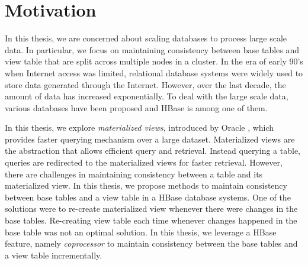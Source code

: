 \documentclass[11pt,a4paper,bibtotoc,idxtotoc,headsepline,footsepline,footexclude,BCOR12mm,DIV13]{scrbook}
\begin{document}

\section{Motivation}
\label{Motivation}


In this thesis, we are concerned about scaling databases to process large scale data. In particular, we focus on maintaining consistency between base tables and view table that are split across multiple nodes in a cluster. In the era of early 90's when Internet access was limited, relational database systems were widely used to store data generated through the Internet. However, over the last decade, the amount of data has increased exponentially. To deal with the large scale data, various databases have been proposed and HBase is among one of them.

In this thesis, we explore \emph{materialized views}, introduced by Oracle \cite{bello1998materialized}, which provides faster querying mechanism over a large dataset. Materialized views  are the abstraction that allows efficient 
query and retrieval. Instead querying a table, queries are redirected to the materialized views for faster retrieval. However, there are challenges in maintaining consistency between a table and its materialized view. In this thesis, we propose methods to maintain consistency between base tables and a view table in a HBase database systems. One of the solutions were to re-create materialized view whenever there were changes in the base tables. Re-creating view table each time whenever changes happened in the base table was not an optimal solution. In this thesis, we leverage a HBase feature, namely \emph{coprocessor} to maintain consistency between the base tables and a view table incrementally. 
\end{document}
